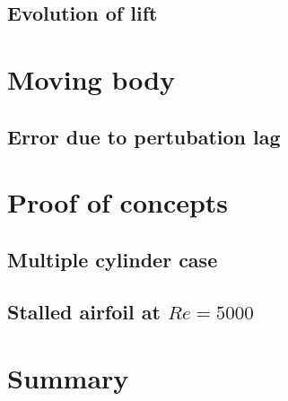 	\subsection{Evolution of lift}

\section{Moving body}

	\subsection{Error due to pertubation lag}

\section{Proof of concepts}

	\subsection{Multiple cylinder case}
	
	\subsection{Stalled airfoil at $Re=5000$}

\section{Summary}